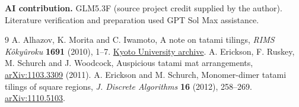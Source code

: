 \documentclass[11pt]{article}
\begin{document}
\textbf{AI contribution.} GLM5.3F (source project credit supplied by the
author). Literature verification and preparation used GPT Sol Max assistance.

\begin{thebibliography}{9}
 A. Alhazov, K. Morita and C. Iwamoto, A note on tatami tilings,
\emph{RIMS K\^oky\^uroku} \textbf{1691} (2010), 1--7.
\href{https://www.kurims.kyoto-u.ac.jp/~kyodo/kokyuroku/contents/pdf/1691-01.pdf}{Kyoto University archive}.
 A. Erickson, F. Ruskey, M. Schurch and J. Woodcock,
Auspicious tatami mat arrangements,
\href{https://arxiv.org/abs/1103.3309}{arXiv:1103.3309} (2011).
 A. Erickson and M. Schurch, Monomer-dimer tatami tilings of
square regions, \emph{J. Discrete Algorithms} \textbf{16} (2012), 258--269.
\href{https://arxiv.org/abs/1110.5103}{arXiv:1110.5103}.
\end{thebibliography}
\end{document}
